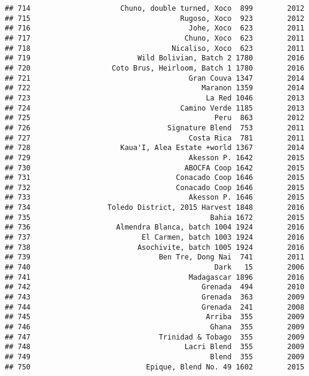 \documentclass[
]{article}
\begin{document}
\begin{verbatim}
## 714                     Chuno, double turned, Xoco  899        2012
## 715                                   Rugoso, Xoco  923        2012
## 716                                     Johe, Xoco  623        2011
## 717                                    Chuno, Xoco  623        2011
## 718                                 Nicaliso, Xoco  623        2011
## 719                         Wild Bolivian, Batch 2 1780        2016
## 720                   Coto Brus, Heirloom, Batch 1 1780        2016
## 721                                     Gran Couva 1347        2014
## 722                                        Maranon 1359        2014
## 723                                         La Red 1046        2013
## 724                                   Camino Verde 1185        2013
## 725                                           Peru  863        2012
## 726                                Signature Blend  753        2011
## 727                                     Costa Rica  781        2011
## 728                     Kaua'I, Alea Estate +world 1367        2014
## 729                                     Akesson P. 1642        2015
## 730                                    ABOCFA Coop 1642        2015
## 731                                  Conacado Coop 1646        2015
## 732                                  Conacado Coop 1646        2015
## 733                                     Akesson P. 1646        2015
## 734                  Toledo District, 2015 Harvest 1848        2016
## 735                                          Bahia 1672        2015
## 736                    Almendra Blanca, batch 1004 1924        2016
## 737                          El Carmen, batch 1003 1924        2016
## 738                         Asochivite, batch 1005 1924        2016
## 739                              Ben Tre, Dong Nai  741        2011
## 740                                           Dark   15        2006
## 741                                     Madagascar 1896        2016
## 742                                        Grenada  494        2010
## 743                                        Grenada  363        2009
## 744                                        Grenada  241        2008
## 745                                         Arriba  355        2009
## 746                                          Ghana  355        2009
## 747                              Trinidad & Tobago  355        2009
## 748                                    Lacri Blend  355        2009
## 749                                          Blend  355        2009
## 750                           Epique, Blend No. 49 1602        2015

\end{verbatim}
\end{document}
